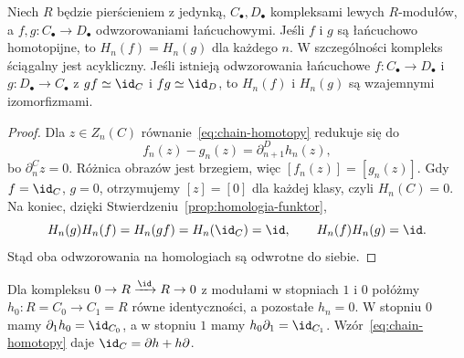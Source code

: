 \begin{twierdzenie}
\label{thm:homotopia-homologia}
Niech $R$ będzie pierścieniem z jedynką,
$C_\bullet,D_\bullet$ kompleksami lewych $R$-modułów,
a $f,g:C_\bullet\to D_\bullet$
odwzorowaniami łańcuchowymi.
Jeśli $f$ i $g$ są łańcuchowo homotopijne,
to $H_n(f)=H_n(g)$ dla każdego $n$.
W szczególności kompleks ściągalny jest
acykliczny. Jeśli istnieją odwzorowania łańcuchowe
$f:C_\bullet\to D_\bullet$ i
$g:D_\bullet\to C_\bullet$ z
$gf\simeq\id_C$ i $fg\simeq\id_D$,
to $H_n(f)$ i $H_n(g)$ są wzajemnymi
izomorfizmami.
\end{twierdzenie}
\begin{proof}
Dla $z\in Z_n(C)$ równanie~\eqref{eq:chain-homotopy}
redukuje się do
\[
 f_n(z)-g_n(z)=\partial^D_{n+1}h_n(z),
\]
bo $\partial^C_nz=0$. Różnica obrazów jest
brzegiem, więc $[f_n(z)]=[g_n(z)]$.
Gdy $f=\id_C$, $g=0$, otrzymujemy
$[z]=[0]$ dla każdej klasy, czyli
$H_n(C)=0$.
Na koniec, dzięki
Stwierdzeniu~\ref{prop:homologia-funktor},
\[
 H_n(g)H_n(f)=H_n(gf)
 =H_n(\id_C)=\id,\qquad
 H_n(f)H_n(g)=\id.
\]
Stąd oba odwzorowania na homologiach są
odwrotne do siebie.
\end{proof}

\begin{przyklad}
Dla kompleksu
$0\to R\xrightarrow{\id}R\to0$
z modułami w stopniach $1$ i $0$
połóżmy $h_0:R=C_0\to C_1=R$
równe identyczności, a pozostałe
$h_n=0$. W stopniu $0$ mamy
$\partial_1h_0=\id_{C_0}$, a w stopniu
$1$ mamy $h_0\partial_1=\id_{C_1}$.
Wzór~\eqref{eq:chain-homotopy}
daje $\id_C=\partial h+h\partial$.
\end{przyklad}

